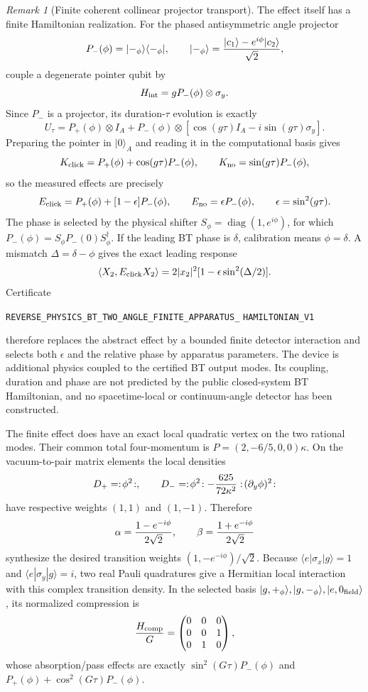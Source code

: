 \documentclass[11pt]{article}
\theoremstyle{definition}
\theoremstyle{remark}
\newtheorem{remark}[theorem]{Remark}
\begin{document}
\begin{remark}[Finite coherent collinear projector transport]
The effect itself has a finite Hamiltonian realization.  For the phased
antisymmetric angle projector
\[
 P_-(\phi)=|-_\phi\rangle\langle-_\phi|,\qquad
 |-_\phi\rangle={|c_1\rangle-e^{i\phi}|c_2\rangle\over\sqrt2},
\]
couple a degenerate pointer qubit by
\[
 H_{\rm int}=gP_-(\phi)\otimes\sigma_y.
\]
Since $P_-$ is a projector, its duration-$\tau$ evolution is exactly
\[
 U_\tau=P_+(\phi)\otimes I_A+P_-(\phi)\otimes
 [\cos(g\tau)I_A-i\sin(g\tau)\sigma_y].
\]
Preparing the pointer in $|0\rangle_A$ and reading it in the computational
basis gives
\[
 K_{\rm click}=P_+(\phi)+\cos(g\tau)P_-(\phi),\qquad
 K_{\rm no}=\sin(g\tau)P_-(\phi),
\]
so the measured effects are precisely
\[
 E_{\rm click}=P_+(\phi)+[1-\epsilon]P_-(\phi),\qquad
 E_{\rm no}=\epsilon P_-(\phi),\qquad
 \epsilon=\sin^2(g\tau).
\]
The phase is selected by the physical shifter
$S_\phi=\operatorname{diag}(1,e^{i\phi})$, for which
$P_-(\phi)=S_\phi P_-(0)S_\phi^\dagger$.  If the leading BT phase is
$\delta$, calibration means $\phi=\delta$.  A mismatch
$\Delta=\delta-\phi$ gives the exact leading response
\[
 \langle X_2,E_{\rm click}X_2\rangle
 =2|x_2|^2[1-\epsilon\sin^2(\Delta/2)].
\]
Certificate
\par\noindent
\texttt{REVERSE\_PHYSICS\_BT\_TWO\_ANGLE\_FINITE\_APPARATUS\_}
\allowbreak\texttt{HAMILTONIAN\_V1}
\par\noindent
therefore replaces the abstract effect by a bounded finite detector
interaction and selects both $\epsilon$ and the relative phase by apparatus
parameters.  The device is additional physics coupled to the certified BT
output modes.  Its coupling, duration and phase are not predicted by the
public closed-system BT Hamiltonian, and no spacetime-local or
continuum-angle detector has been constructed.

The finite effect does have an exact local quadratic vertex on the two
rational modes.  Their common total four-momentum is
$P=(2,-6/5,0,0)\kappa$.  On the vacuum-to-pair matrix elements the local
densities
\[
 D_+=:\!\phi^2\!:,\qquad
 D_-=:\!\phi^2\!:
 -{625\over72\kappa^2}:\!(\partial_y\phi)^2\!:
\]
have respective weights $(1,1)$ and $(1,-1)$.  Therefore
\[
 \alpha={1-e^{-i\phi}\over2\sqrt2},\qquad
 \beta={1+e^{-i\phi}\over2\sqrt2}
\]
synthesize the desired transition weights
$(1,-e^{-i\phi})/\sqrt2$.  Because
$\langle e|\sigma_x|g\rangle=1$ and
$\langle e|\sigma_y|g\rangle=i$, two real Pauli quadratures give a Hermitian
local interaction with this complex transition density.  In the selected
basis
$|g,+_\phi\rangle,|g,-_\phi\rangle,|e,0_{\rm field}\rangle$, its normalized
compression is
\[
 {H_{\rm comp}\over G}=\begin{pmatrix}0&0&0\\0&0&1\\0&1&0\end{pmatrix},
\]
whose absorption/pass effects are exactly
$\sin^2(G\tau)P_-(\phi)$ and
$P_+(\phi)+\cos^2(G\tau)P_-(\phi)$.


\end{remark}
\end{document}
